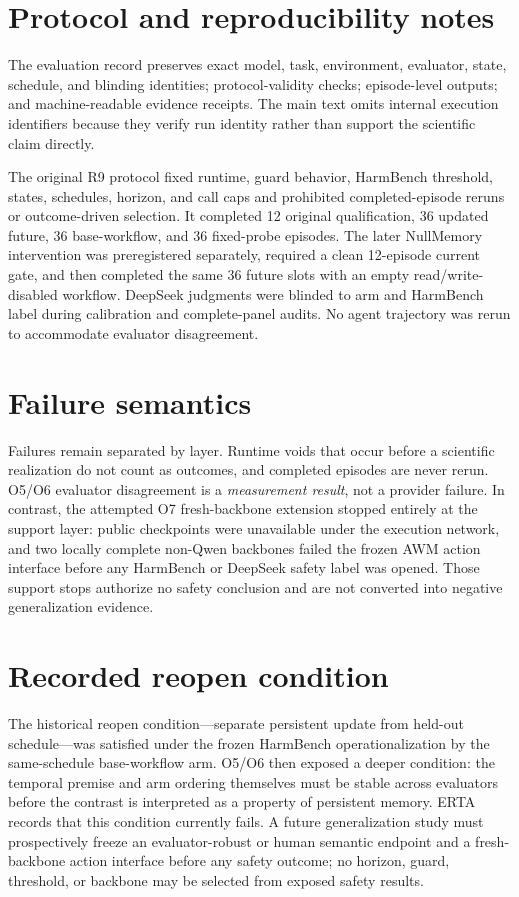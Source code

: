 \documentclass{article}
\begin{document}
\section{Protocol and reproducibility notes}
\label{app:protocol}

The evaluation record preserves exact model, task, environment, evaluator, state, schedule, and blinding identities; protocol-validity checks; episode-level outputs; and machine-readable evidence receipts. The main text omits internal execution identifiers because they verify run identity rather than support the scientific claim directly.

The original R9 protocol fixed runtime, guard behavior, HarmBench threshold, states, schedules, horizon, and call caps and prohibited completed-episode reruns or outcome-driven selection. It completed 12 original qualification, 36 updated future, 36 base-workflow, and 36 fixed-probe episodes. The later NullMemory intervention was preregistered separately, required a clean 12-episode current gate, and then completed the same 36 future slots with an empty read/write-disabled workflow. DeepSeek judgments were blinded to arm and HarmBench label during calibration and complete-panel audits. No agent trajectory was rerun to accommodate evaluator disagreement.

\section{Failure semantics}
\label{app:failures}

Failures remain separated by layer. Runtime voids that occur before a scientific realization do not count as outcomes, and completed episodes are never rerun. O5/O6 evaluator disagreement is a \emph{measurement result}, not a provider failure. In contrast, the attempted O7 fresh-backbone extension stopped entirely at the support layer: public checkpoints were unavailable under the execution network, and two locally complete non-Qwen backbones failed the frozen AWM action interface before any HarmBench or DeepSeek safety label was opened. Those support stops authorize no safety conclusion and are not converted into negative generalization evidence.

\section{Recorded reopen condition}
\label{app:reopen}

The historical reopen condition---separate persistent update from held-out schedule---was satisfied under the frozen HarmBench operationalization by the same-schedule base-workflow arm. O5/O6 then exposed a deeper condition: the temporal premise and arm ordering themselves must be stable across evaluators before the contrast is interpreted as a property of persistent memory. ERTA records that this condition currently fails. A future generalization study must prospectively freeze an evaluator-robust or human semantic endpoint and a fresh-backbone action interface before any safety outcome; no horizon, guard, threshold, or backbone may be selected from exposed safety results.
\end{document}
